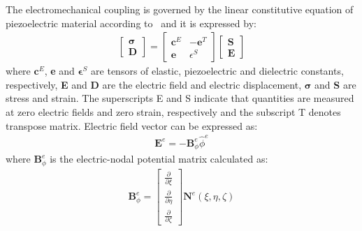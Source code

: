\documentclass[materials,article,submit,moreauthors,pdftex]{Definitions/mdpi}
\begin{document}
The electromechanical coupling is governed by the linear constitutive equation of piezoelectric material according to~\cite{giurgiutiumicromechatronics} and it is expressed by:
\begin{eqnarray}
\left [ 
\begin {array}{c}
\boldsymbol{\sigma}\\
\textbf{D}
\end{array}\right ]=
\left [ 
\begin{array}{cc}
\textbf{c}^E & -\textbf{e}^T \\
\textbf{e} & \epsilon^S 
\end{array} \right ]
\left[ 
\begin{array}{c}
\textbf{S}\\
\textbf{E} 
\end{array} \right ]
\end{eqnarray}
where \(\textbf{c}^E\), \textbf{e} and \(\boldsymbol{\epsilon}^S\) are tensors of elastic, piezoelectric and dielectric constants, respectively, \textbf{E} and \textbf{D} are the electric field and electric displacement, \(\boldsymbol{\sigma}\) and \textbf{S} are stress and strain.
The superscripts E and S indicate that quantities are measured at zero electric fields and zero strain, respectively and the subscript T denotes transpose matrix.
Electric field vector can be expressed as:
\begin{eqnarray}
\textbf{E}^e=-\textbf{B}_\phi^e \widehat{\phi}^e
\end{eqnarray}
where \(\textbf{B}_\phi^e\) is the electric-nodal potential matrix calculated as:
\begin{eqnarray}
\textbf{B}_\phi^e=
\left[ \begin{array}{c}
\frac{\partial }{\partial \xi}\\
\frac{\partial }{\partial \eta}\\
\frac{\partial }{\partial \zeta}
\end{array} \right]\textbf{N}^e(\xi,\eta,\zeta)
\end{eqnarray}
\end{document}
